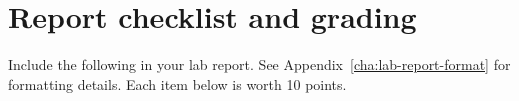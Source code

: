 %

%
%

\section{Report checklist and grading}

Include the following in your lab report. See Appendix~\ref{cha:lab-report-format} for formatting details. Each item below is worth 10 points.

